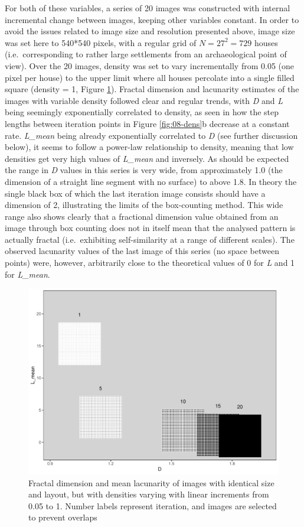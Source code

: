 \documentclass[
  12pt,
]{book}
\begin{document}
For both of these variables, a series of 20 images was constructed with internal incremental change between images, keeping other variables constant. In order to avoid the issues related to image size and resolution presented above, image size was set here to 540*540 pixels, with a regular grid of \(N = 27^2 = 729\) houses (i.e.~corresponding to rather large settlements from an archaeological point of view). Over the 20 images, density was set to vary incrementally from 0.05 (one pixel per house) to the upper limit where all houses percolate into a single filled square (density = 1, Figure \ref{fig:08-dens-im}). Fractal dimension and lacunarity estimates of the images with variable density followed clear and regular trends, with \emph{D} and \emph{L} being seemingly exponentially correlated to density, as seen in how the step lengths between iteration points in Figure \ref{fig:08-dens}b decrease at a constant rate. \emph{L\_mean} being already exponentially correlated to \emph{D} (see further discussion below), it seems to follow a power-law relationship to density, meaning that low densities get very high values of \emph{L\_mean} and inversely. As should be expected the range in \emph{D} values in this series is very wide, from approximately 1.0 (the dimension of a straight line segment with no surface) to above 1.8. In theory the single black box of which the last iteration image consists should have a dimension of 2, illustrating the limits of the box-counting method. This wide range also shows clearly that a fractional dimension value obtained from an image through box counting does not in itself mean that the analysed pattern is actually fractal (i.e.~exhibiting self-similarity at a range of different scales). The observed lacunarity values of the last image of this series (no space between points) were, however, arbitrarily close to the theoretical values of 0 for \emph{L} and 1 for \emph{L\_mean}.

\begin{figure}
\hypertarget{fig:08-dens-im}{%
\centering
\includegraphics{Results/fig08_dens_im.pdf}
\caption{Fractal dimension and mean lacunarity of images with identical size and layout, but with densities varying with linear increments from 0.05 to 1. Number labels represent iteration, and images are selected to prevent overlaps}\label{fig:08-dens-im}
}
\end{figure}
\end{document}
